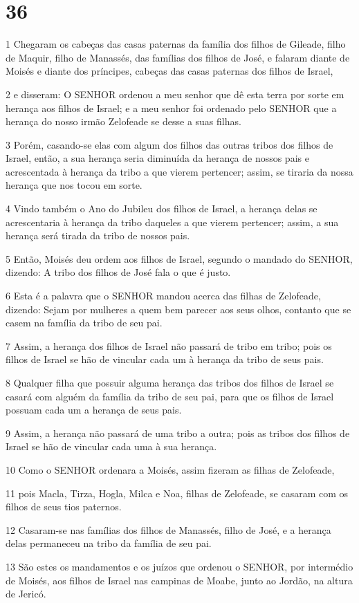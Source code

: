 \chapter{36}

\par 1 Chegaram os cabeças das casas paternas da família dos filhos de Gileade, filho de Maquir, filho de Manassés, das famílias dos filhos de José, e falaram diante de Moisés e diante dos príncipes, cabeças das casas paternas dos filhos de Israel,
\par 2 e disseram: O SENHOR ordenou a meu senhor que dê esta terra por sorte em herança aos filhos de Israel; e a meu senhor foi ordenado pelo SENHOR que a herança do nosso irmão Zelofeade se desse a suas filhas.
\par 3 Porém, casando-se elas com algum dos filhos das outras tribos dos filhos de Israel, então, a sua herança seria diminuída da herança de nossos pais e acrescentada à herança da tribo a que vierem pertencer; assim, se tiraria da nossa herança que nos tocou em sorte.
\par 4 Vindo também o Ano do Jubileu dos filhos de Israel, a herança delas se acrescentaria à herança da tribo daqueles a que vierem pertencer; assim, a sua herança será tirada da tribo de nossos pais.
\par 5 Então, Moisés deu ordem aos filhos de Israel, segundo o mandado do SENHOR, dizendo: A tribo dos filhos de José fala o que é justo.
\par 6 Esta é a palavra que o SENHOR mandou acerca das filhas de Zelofeade, dizendo: Sejam por mulheres a quem bem parecer aos seus olhos, contanto que se casem na família da tribo de seu pai.
\par 7 Assim, a herança dos filhos de Israel não passará de tribo em tribo; pois os filhos de Israel se hão de vincular cada um à herança da tribo de seus pais.
\par 8 Qualquer filha que possuir alguma herança das tribos dos filhos de Israel se casará com alguém da família da tribo de seu pai, para que os filhos de Israel possuam cada um a herança de seus pais.
\par 9 Assim, a herança não passará de uma tribo a outra; pois as tribos dos filhos de Israel se hão de vincular cada uma à sua herança.
\par 10 Como o SENHOR ordenara a Moisés, assim fizeram as filhas de Zelofeade,
\par 11 pois Macla, Tirza, Hogla, Milca e Noa, filhas de Zelofeade, se casaram com os filhos de seus tios paternos.
\par 12 Casaram-se nas famílias dos filhos de Manassés, filho de José, e a herança delas permaneceu na tribo da família de seu pai.
\par 13 São estes os mandamentos e os juízos que ordenou o SENHOR, por intermédio de Moisés, aos filhos de Israel nas campinas de Moabe, junto ao Jordão, na altura de Jericó.



